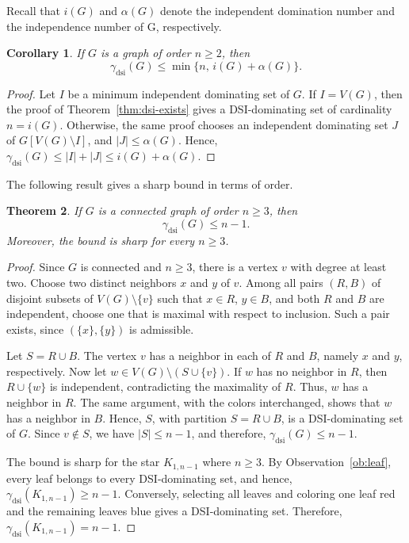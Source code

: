 \documentclass[11pt]{article}
\newtheorem{theorem}{Theorem}
\newtheorem{corollary}[theorem]{Corollary}
\theoremstyle{definition}
\theoremstyle{remark}
\newcommand{\dsi}{\mathrm{dsi}}
\begin{document}
Recall that  \(i(G)\) and $\alpha(G)$ denote the independent domination number and the independence number of G, respectively.

\begin{corollary}
\label{cor:i-alpha}
If \(G\) is a  graph of order \(n\ge 2\), then
\[
   \gamma_{\dsi}(G)\le \min\{n,\, i(G)+\alpha(G)\}.
\]
\end{corollary}

\begin{proof}
Let \(I\) be a minimum independent dominating set of \(G\). If \(I=V(G)\),
then the proof of  Theorem~\ref{thm:dsi-exists} gives a
DSI-dominating set of cardinality \(n=i(G)\). Otherwise, the same proof
chooses an independent dominating set \(J\) of \(G[V(G)\setminus I]\), and
\(|J|\le \alpha(G)\). Hence,
\(\gamma_{\dsi}(G)\le |I|+|J|\le i(G)+\alpha(G)\). 
\end{proof}

The following result gives a sharp bound in terms of order.

\begin{theorem}
\label{thm:order-upper}
If \(G\) is a connected graph of order \(n\ge 3\), then
\[
   \gamma_{\dsi}(G)\le n-1.
\]
Moreover, the bound is sharp for every \(n\ge 3\).
\end{theorem}

\begin{proof}
Since \(G\) is connected and \(n\ge 3\), there is a vertex \(v\) with degree
at least two. Choose two distinct neighbors \(x\) and \(y\) of \(v\). Among
all pairs \((R,B)\) of disjoint subsets of \(V(G)\setminus\{v\}\) such that
\(x\in R\), \(y\in B\), and both \(R\) and \(B\) are independent, choose one
that is maximal with respect to inclusion. Such a pair exists, since
\((\{x\},\{y\})\) is admissible.

Let \(S=R\cup B\). The vertex \(v\) has a neighbor in each of \(R\) and
\(B\), namely \(x\) and \(y\), respectively. Now let
\(w\in V(G)\setminus (S\cup\{v\})\). If \(w\) has no neighbor in \(R\), then
\(R\cup\{w\}\) is independent, contradicting the maximality of \(R\).
Thus, \(w\) has a neighbor in \(R\). The same argument, with the colors
interchanged, shows that \(w\) has a neighbor in \(B\). Hence, \(S\), with
partition \(S=R\cup B\), is a DSI-dominating set of \(G\). Since \(v\notin S\),
we have \(|S|\le n-1\), and therefore, \(\gamma_{\dsi}(G)\le n-1\).

The bound is sharp for the star \(K_{1,n-1}\) where $n \ge 3$. By Observation~\ref{ob:leaf}, every leaf belongs to every
DSI-dominating set, and hence, 
\(\gamma_{\dsi}(K_{1,n-1})\ge n-1\). Conversely, selecting all leaves and
coloring one leaf red and the remaining leaves   blue gives a
DSI-dominating set. Therefore, 
\(\gamma_{\dsi}(K_{1,n-1})=n-1\).
\end{proof}
\end{document}
